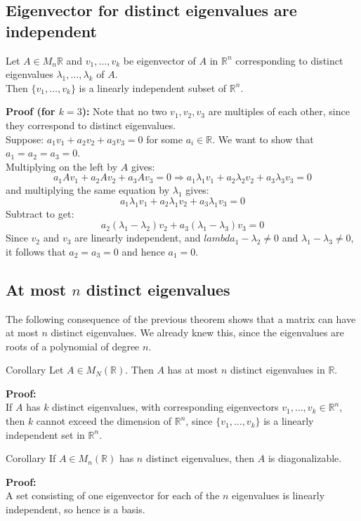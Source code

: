 \documentclass[a4paper, 9pt]{extarticle}
\begin{document}
\subsection{Eigenvector for distinct eigenvalues are independent}
\begin{theorembox}{}{}
  Let $A \in M_n{\mathbb{R}}$ and $v_1, \ldots, v_k$ be eigenvector of $A$ in $\mathbb{R}^n$ corresponding to distinct eigenvalues $\lambda_1, \ldots, \lambda_k$ of $A$. \\[2ex]
  Then $\{v_1, \ldots, v_k\}$ is a linearly independent subset of $\mathbb{R}^n$.
\end{theorembox}
\noindent\textbf{Proof (for $k = 3$):}
Note that no two $v_1, v_2, v_3$ are multiples of each other, since they correspond to distinct eigenvalues. \\[2ex]
Suppose: $a_1v_1 + a_2v_2 + a_3v_3 = 0$ for some $a_i \in \mathbb{R}$. We want to show that $a_1 = a_2 = a_3 = 0$. \\
Multiplying on the left by $A$ gives:
$$
  a_1Av_1 + a_2Av_2 + a_3Av_3 = 0 \Longrightarrow a_1\lambda_1v_1 + a_2\lambda_2v_2 + a_3\lambda_3v_3 = 0
$$
and multiplying the same equation by $\lambda_1$ gives:
$$
  a_1 \lambda_1 v_1 + a_2 \lambda_1 v_2 + a_3 \lambda_1 v_3 = 0
$$
Subtract to get:
$$a_2(\lambda_1 - \lambda_2)v_2 + a_3(\lambda_1 - \lambda_3)v_3 = 0$$
Since $v_2$ and $v_3$ are linearly independent, and $lambda_1 - \lambda_2 \neq 0$ and $\lambda_1 - \lambda_3 \neq 0$, it follows that $a_2 = a_3 = 0$ and hence $a_1 = 0$.
\subsection{At most $n$ distinct eigenvalues}
The following consequence of the previous theorem shows that  a matrix can have at most $n$ distinct eigenvalues. We already knew this, since the eigenvalues are roots of a polynomial of degree $n$.
\begin{theorembox}{Corollary}{}
  Let $A \in M_N(\mathbb{R})$. Then $A$ has at most $n$ distinct eigenvalues in $\mathbb{R}$.
\end{theorembox}
\noindent\textbf{Proof:} \\
If $A$ has $k$ distinct eigenvalues, with corresponding eigenvectors $v_1, \ldots, v_k \in \mathbb{R}^n$, then $k$ cannot exceed the dimension of $\mathbb{R}^n$, since $\{v_1, \dots, v_k\}$ is a linearly independent set in $\mathbb{R}^n$.
\begin{theorembox}{Corollary}{}
  If $A \in M_n(\mathbb{R})$ has $n$ distinct eigenvalues, then $A$ is diagonalizable.
\end{theorembox}
\noindent\textbf{Proof:} \\
A set consisting of one eigenvector for each of the $n$ eigenvalues is linearly independent, so hence is a basis.
\end{document}
